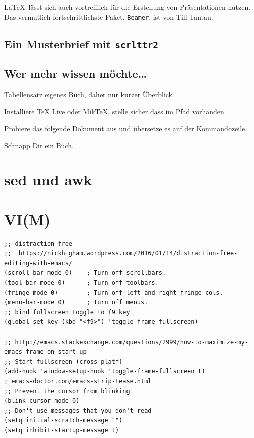 \documentclass[12pt,ngerman]{scrbook}
\begin{document}
\LaTeX\ lässt sich auch vortrefflich für die Erstellung von Präsentationen nutzen. Das vermutlich fortschrittlichste Paket, \texttt{Beamer}, ist von Till Tantau. 

\subsection{Ein Musterbrief mit \texttt{scrlttr2}}


\subsection{Wer mehr wissen möchte\ldots}


Tabellensatz eigenes Buch, daher nur kurzer Überblick

Installiere TeX Live oder MikTeX, stelle sicher dass im Pfad vorhanden

Probiere das folgende Dokument aus und übersetze es auf der Kommandozeile.

Schnapp Dir ein Buch.

\section{sed und awk}

\section{VI(M)}



\backmatter

\blindtext

\begin{lstlisting}[basicstyle=\ttfamily] % <--- here
;; distraction-free
;;  https://nickhigham.wordpress.com/2016/01/14/distraction-free-editing-with-emacs/
(scroll-bar-mode 0)    ; Turn off scrollbars.
(tool-bar-mode 0)      ; Turn off toolbars.
(fringe-mode 0)        ; Turn off left and right fringe cols.
(menu-bar-mode 0)      ; Turn off menus.
;; bind fullscreen toggle to f9 key
(global-set-key (kbd "<f9>") 'toggle-frame-fullscreen)

;; http://emacs.stackexchange.com/questions/2999/how-to-maximize-my-emacs-frame-on-start-up
;; Start fullscreen (cross-platf)
(add-hook 'window-setup-hook 'toggle-frame-fullscreen t)
; emacs-doctor.com/emacs-strip-tease.html
;; Prevent the cursor from blinking
(blink-cursor-mode 0)
;; Don't use messages that you don't read
(setq initial-scratch-message "")
(setq inhibit-startup-message t)
\end{lstlisting}

\nocite{*}

\printbibliography 
\end{document}
